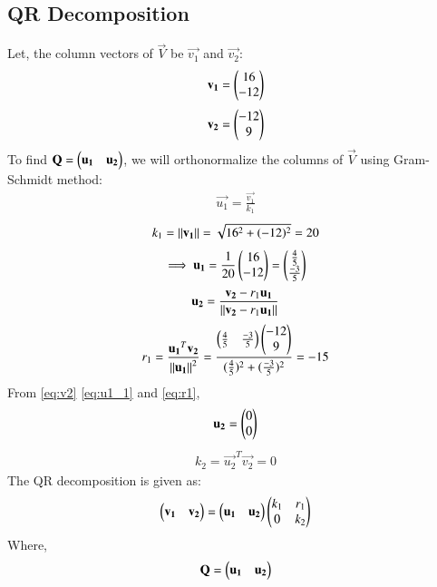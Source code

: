 \documentclass[journal,12pt,twocolumn]{IEEEtran}
\begin{document}
\subsection{QR Decomposition}
Let, the column vectors of $\vec{V}$ be $\vec{v_1}$ and $\vec{v_2}$: 
\begin{align}
   \mathbf{v_1}=\begin{pmatrix}16 \\ -12\end{pmatrix} \label{eq:v1}
\end{align}
\begin{align}
   \mathbf{v_2}=\begin{pmatrix}-12 \\ 9\end{pmatrix} \label{eq:v2}
\end{align}
\quad To find $\mathbf{Q}=\begin{pmatrix}\mathbf{u_1}\quad \mathbf{u_2}\end{pmatrix}$, we will orthonormalize the columns of $\vec{V}$ using Gram-Schmidt method:
\begin{align}
 \vec{u_1}=\frac{\vec{v_1}}{k_1}  \label{eq:u1}
\end{align}
\begin{align}
 k_1=\left\lVert\mathbf{v_1}\right\rVert=\sqrt{16^2+(-12)^2}=20  \label{eq:k1}
\end{align}
\begin{align}
\implies \mathbf{u_1}=\frac{1}{20}\begin{pmatrix}16 \\ -12\end{pmatrix}=\begin{pmatrix}\frac{4}{5}\\ \frac{-3}{5}\end{pmatrix}  \label{eq:u1_1}
\end{align}
\begin{align}
 \mathbf{u_2}=\frac{\mathbf{v_2}-r_1\mathbf{u_1}}{\left\lVert\mathbf{v_2}-r_1\mathbf{u_1}\right\rVert}  \label{eq:u2}
\end{align}
\begin{align}
 r_1=\frac{\mathbf{u_1}^T\mathbf{v_2}}{\left\lVert\mathbf{u_1}\right\rVert^2}=\frac{\begin{pmatrix}\frac{4}{5}\quad \frac{-3}{5}\end{pmatrix}\begin{pmatrix}-12\\9\end{pmatrix}}{(\frac{4}{5})^2+(\frac{-3}{5})^2} = -15 \label{eq:r1}
\end{align}
From \eqref{eq:v2} \eqref{eq:u1_1}  and \eqref{eq:r1},
\begin{align}
\mathbf{u_2}=\begin{pmatrix}0 \\ 0\end{pmatrix} \label{eq:u2_1}
\end{align}
\begin{align}
 k_2=\vec{u_2}^T\vec{v_2}=0  \label{eq:k2}
\end{align}
The QR decomposition is given as:
\begin{align}
\begin{pmatrix}\mathbf{v_1}\quad \mathbf{v_2}\end{pmatrix}=\begin{pmatrix}\mathbf{u_1}\quad \mathbf{u_2}\end{pmatrix} \begin{pmatrix}k_1 & r_1 \\ 0 & k_2\end{pmatrix} \label{eq:QR}
\end{align}
Where,
\begin{align}
 \mathbf{Q}=\begin{pmatrix}\mathbf{u_1}\quad\mathbf{u_2}\end{pmatrix}  \label{eq:Q}
\end{align}
\end{document}
